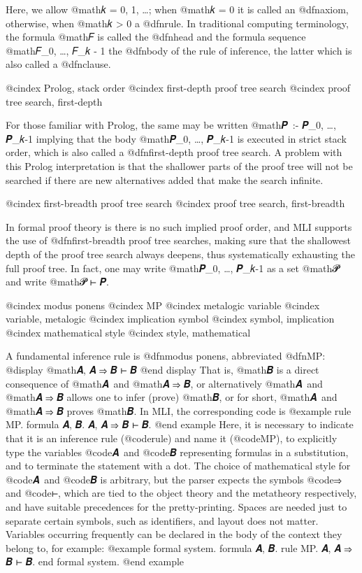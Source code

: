 Here, we allow @math{𝑘 = 0, 1, …}; when @math{𝑘 = 0} it is called an @dfn{axiom}, otherwise, when @math{𝑘 > 0} a @dfn{rule}. In traditional computing terminology, the formula @math{𝐹} is called the @dfn{head} and the formula sequence @math{𝐹_0, …, 𝐹_{𝑘 - 1}} the @dfn{body} of the rule of inference, the latter which is also called a @dfn{clause}.


@cindex Prolog, stack order
@cindex first-depth proof tree search
@cindex proof tree search, first-depth

For those familiar with Prolog, the same may be written
@math{𝑷 \,{:}{-} 𝑷_0, …, 𝑷_{𝑘-1}}
implying that the body @math{𝑷_0, …, 𝑷_{𝑘-1}} is executed in strict stack order, which is also called a @dfn{first-depth} proof tree search. A problem with this Prolog interpretation is that the shallower parts of the proof tree will not be searched if there are new alternatives added that make the search infinite.


@cindex first-breadth proof tree search
@cindex proof tree search, first-breadth

In formal proof theory is there is no such implied proof order, and MLI supports the use of @dfn{first-breadth} proof tree searches, making sure that the shallowest depth of the proof tree search always deepens, thus systematically exhausting the full proof tree. In fact, one may write @math{𝑷_0, …, 𝑷_{𝑘-1}} as a set @math{𝓟} and write @math{𝓟 ⊢ 𝑷}.


@cindex modus ponens
@cindex MP
@cindex metalogic variable
@cindex variable, metalogic
@cindex implication symbol
@cindex symbol, implication
@cindex mathematical style
@cindex style, mathematical

A fundamental inference rule is @dfn{modus ponens}, abbreviated @dfn{MP}:
@display
@math{𝑨, 𝑨 ⇒ 𝑩 ⊢ 𝑩}
@end display
That is, @math{𝑩} is a direct consequence of @math{𝑨} and @math{𝑨 ⇒ 𝑩}, or alternatively @math{𝑨} and @math{𝑨 ⇒ 𝑩} allows one to infer (prove) @math{𝑩}, or for short, @math{𝑨} and @math{𝑨 ⇒ 𝑩} proves @math{𝑩}.
In MLI, the corresponding code is
@example
rule MP. formula 𝑨, 𝑩. 𝑨, 𝑨 ⇒ 𝑩 ⊢ 𝑩.
@end example
Here, it is necessary to indicate that it is an inference rule (@code{rule}) and name it (@code{MP}), to explicitly type the variables @code{𝑨} and @code{𝑩} representing formulas in a substitution, and to terminate the statement with a dot. The choice of mathematical style for @code{𝑨} and @code{𝑩} is arbitrary, but the parser expects the symbols @code{⇒} and @code{⊢}, which are tied to the object theory and the metatheory respectively, and have suitable precedences for the pretty-printing. Spaces are needed just to separate certain symbols, such as identifiers, and layout does not matter. Variables occurring frequently can be declared in the body of the context they belong to, for example:
@example
formal system.
  formula 𝑨, 𝑩.
  rule MP. 𝑨, 𝑨 ⇒ 𝑩 ⊢ 𝑩.
end formal system.
@end example


